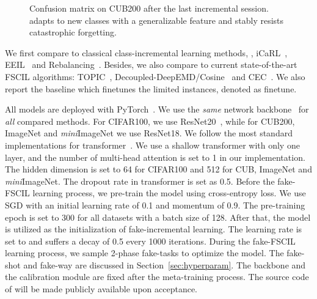 \begin{figure*}[h]
	\begin{center}
	\end{center}
	
	\caption{  Confusion matrix on CUB200 after the last incremental session.  	{\name adapts to new classes with a generalizable feature and stably resists catastrophic forgetting. }
	} \label{figure:confmat}
	
\end{figure*}



 We first compare to classical class-incremental learning methods, \eg, iCaRL~\cite{rebuffi2017icarl}, EEIL~\cite{castro2018end} and Rebalancing~\cite{hou2019learning}. Besides, we also compare to current state-of-the-art FSCIL algorithms: TOPIC~\cite{tao2020few}, 
 Decoupled-DeepEMD/Cosine~\cite{zhang2020deepemd,vinyals2016matching} and CEC~\cite{zhang2021few}. We also report the baseline  which finetunes the limited instances, denoted as finetune.





All models are deployed with PyTorch~\cite{paszke2019pytorch}.
 We use the \emph{same} network backbone~\cite{tao2020few} for \emph{all} compared methods. For CIFAR100, we use ResNet20~\cite{he2015residual}, while for CUB200, ImageNet and {\it mini}ImageNet we use ResNet18. We follow the most standard implementations for transformer~\cite{vaswani2017attention}. We use a shallow transformer with only one layer, and the number of multi-head attention is set to 1 in our implementation.  The hidden dimension is set to 64 for CIFAR100 and 512 for CUB, ImageNet and \textit{mini}ImageNet. The dropout rate in transformer is set as 0.5.
 Before the fake-FSCIL learning process, we pre-train the model using cross-entropy loss. We use SGD with an initial learning rate of 0.1 and momentum of 0.9. The pre-training epoch is set to 300 for all datasets with a batch size of 128. After that, the model is utilized as the initialization of fake-incremental learning. The learning rate is set to  and suffers a decay of 0.5 every 1000 iterations.
 During the fake-FSCIL learning process, we sample 2-phase fake-tasks to optimize the model. 
 The fake-shot and fake-way are discussed in Section~\ref{sec:hyperparam}. The backbone and the calibration module are fixed after the meta-training process.
  The source code of \name will be made publicly available upon acceptance. 
  
